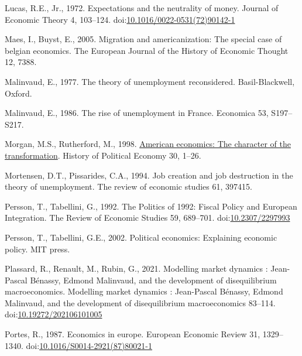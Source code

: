 \documentclass[
  12pt,
  onecolumn]{article}
\newlength{\cslhangindent}
\newlength{\cslentryspacingunit} %
\newenvironment{CSLReferences}[2] %
 {%
  \setlength{\parindent}{0pt}
  \ifodd #1
  \let\oldpar\par
  \def\par{\hangindent=\cslhangindent\oldpar}
  \fi
  \setlength{\parskip}{#2\cslentryspacingunit}
 }%
 {}
\begin{document}
\begin{CSLReferences}{1}{0}
\leavevmode{}%
Lucas, R.E., Jr., 1972. Expectations and the neutrality of money. Journal of Economic Theory 4, 103--124. doi:\href{https://doi.org/10.1016/0022-0531(72)90142-1}{10.1016/0022-0531(72)90142-1}

\leavevmode{}%
Maes, I., Buyst, E., 2005. Migration and americanization: The special case of belgian economics. The European Journal of the History of Economic Thought 12, 7388.

\leavevmode{}%
Malinvaud, E., 1977. The theory of unemployment reconsidered. {Basil-Blackwell}, {Oxford}.

\leavevmode{}%
Malinvaud, E., 1986. The rise of unemployment in {France}. Economica 53, S197--S217.

\leavevmode{}%
Morgan, M.S., Rutherford, M., 1998. \href{http://search.ebscohost.com/login.aspx?direct=true\&db=bth\&AN=7752144\&lang=fr\&site=ehost-live}{American economics: The character of the transformation}. History of Political Economy 30, 1--26.

\leavevmode{}%
Mortensen, D.T., Pissarides, C.A., 1994. Job creation and job destruction in the theory of unemployment. The review of economic studies 61, 397415.

\leavevmode{}%
Persson, T., Tabellini, G., 1992. The {Politics} of 1992: {Fiscal Policy} and {European Integration}. The Review of Economic Studies 59, 689--701. doi:\href{https://doi.org/10.2307/2297993}{10.2307/2297993}

\leavevmode{}%
Persson, T., Tabellini, G.E., 2002. Political economics: Explaining economic policy. {MIT press}.

\leavevmode{}%
Plassard, R., Renault, M., Rubin, G., 2021. Modelling market dynamics : {Jean-Pascal Bénassy}, {Edmond Malinvaud}, and the development of disequilibrium macroeconomics. Modelling market dynamics : Jean-Pascal Bénassy, Edmond Malinvaud, and the development of disequilibrium macroeconomics 83--114. doi:\href{https://doi.org/10.19272/202106101005}{10.19272/202106101005}

\leavevmode{}%
Portes, R., 1987. Economics in europe. European Economic Review 31, 1329--1340. doi:\href{https://doi.org/10.1016/S0014-2921(87)80021-1}{10.1016/S0014-2921(87)80021-1}


\end{CSLReferences}
\end{document}
